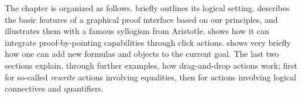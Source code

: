 The chapter is organized as follows.  briefly outlines its
logical setting.  describes the basic features of a graphical
proof interface based on our principles, and illustrates them with a famous
syllogism from Aristotle.  shows how it can integrate
proof-by-pointing capabilities through click actions.  shows
very briefly how one can add new formulas and objects to the current goal. The
last two sections explain, through further examples, how drag-and-drop actions
work; first for so-called \emph{rewrite} actions involving equalities, then for
actions involving logical connectives and quantifiers.






